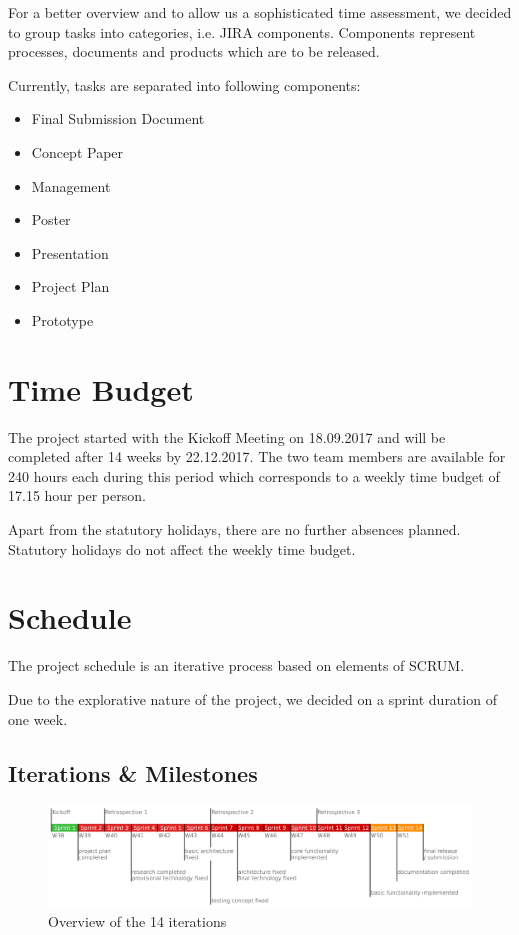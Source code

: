 For a better overview and to allow us a sophisticated time assessment, we decided to group tasks into categories, i.e. JIRA components. Components represent processes, documents and products which are to be released.

Currently, tasks are separated into following components:

\begin{multicols}{2}
	\begin{itemize}
		\item Final Submission Document
		\item Concept Paper
		\item Management
		\item Poster
		\item Presentation
		\item Project Plan
		\item Prototype
	\end{itemize}
\end{multicols}

\section{Time Budget}

The project started with the Kickoff Meeting on 18.09.2017 and will be completed after 14 weeks by 22.12.2017.
The two team members are available for 240 hours each during this period which corresponds to a weekly time budget of 17.15 hour per person.

Apart from the statutory holidays, there are no further absences planned. Statutory holidays do not affect the weekly time budget.

\section{Schedule}
The project schedule is an iterative process based on elements of SCRUM. 

Due to the explorative nature of the project, we decided on a sprint duration of one week.
\subsection{Iterations \& Milestones}

\begin{figure}[h!]
	\centering
	\includegraphics[width=1\linewidth]{resources/overview}
	\caption{Overview of the 14 iterations}
	\label{fig:overview}
\end{figure}

